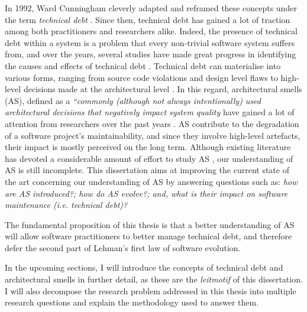 In 1992, Ward Cunningham cleverly adapted and reframed these concepts under the term \emph{technical debt} \cite{Cunningham1992}. %
Since then, technical debt has gained a lot of traction among both practitioners and researchers alike.
Indeed, the presence of technical debt within a system is a problem that every non-trivial software system suffers from, and over the years, several studies have made great progress in identifying the causes and effects of technical debt \cite{Brown2010,Kruchten2012,Lehman1979}.
Technical debt can materialise into various forms, ranging from source code violations \cite{Letouzey2012,Curtis2012} and design level flaws \cite{Marinescu2012} to high-level decisions made at the architectural level \cite{Ernst2015,Yli-Huumo2014}.
In this regard, architectural smells (AS), defined as a \emph{``commonly (although not always intentionally) used architectural decisions that negatively impact system quality} \cite{Garcia2009} have gained a lot of attention from researchers over the past years \cite{Verdecchia2018}.
AS contribute to the degradation of a software project's maintainability, and since they involve high-level artefacts, their impact is mostly perceived on the long term. 
Although existing literature has devoted a considerable amount of effort to study AS \cite{Mo2015,Le2016,Arcelli2016}, our understanding of AS is still incomplete.
This dissertation aims at improving the current state of the art concerning our understanding of AS by answering questions such as: \emph{how are AS introduced?; how do AS evolve?; and, what is their impact on software maintenance (i.e. technical debt)?}

The fundamental proposition of this thesis is that a better understanding of AS will allow software practitioners to better manage technical debt, and therefore defer the second part of Lehman's first law of software evolution.

In the upcoming sections, I will introduce the concepts of technical debt and architectural smells in further detail, as these are the \emph{leitmotif} of this dissertation.
I will also decompose the research problem addressed in this thesis into multiple research questions and explain the methodology used to answer them.


